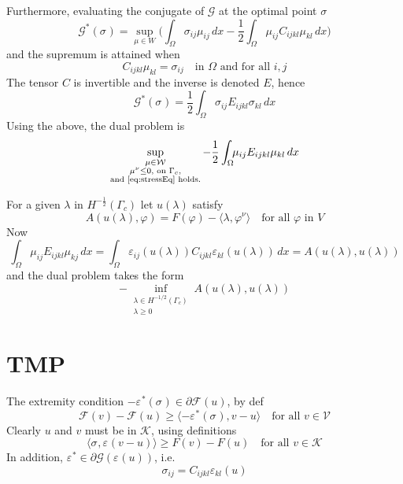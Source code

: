 \documentclass[12pt,a4paper]{article}
\numberwithin{equation}{section}
\numberwithin{table}{section}
\numberwithin{figure}{section}
\newcommand{\W}{\ensuremath{\mathcal{W}}}
\newcommand{\half}{\ensuremath{\frac{1}{2}}}
\newcommand{\V}{\ensuremath{\mathcal{V}}}
\newcommand{\K}{\ensuremath{\mathcal{K}}}
\newcommand{\F}{\ensuremath{{\mathcal F}}}
\newcommand{\G}{\ensuremath{{\mathcal G}}}
\newcommand{\intO}{\int_\Omega\!\!}
\renewcommand{\epsilon}{\varepsilon}
\renewcommand{\phi}{\varphi}
\newcommand{\strain}[1][]{\ensuremath{\epsilon_{#1}}}
\newcommand{\epsij}{\strain[ij]}
\newcommand{\epskl}{\strain[kl]}
\newcommand{\stress}[1][]{\ensuremath{\sigma_{#1}}}
\providecommand{\dualp}[2]{\langle #1, #2 \rangle}
\newcommand{\dx}{{\,dx}}
\newcommand{\ulambda}{\ensuremath{u(\lambda)}}
\begin{document}
Furthermore, evaluating the conjugate of $\G$ at the optimal point $\stress$
\begin{equation}
  \G^*(\stress) = \sup_{\mu\in W} \bigl(\intO \stress[ij] \mu_{ij} \dx
   - \half \intO \mu_{ij} C_{ijkl} \mu_{kl} \dx \bigr)
\end{equation}
and the supremum is attained when
\begin{equation}
  C_{ijkl} \mu_{kl} = \stress[ij] \quad\text{in $\Omega$ and for all $i,j$}
\end{equation}
The tensor $C$ is invertible and the inverse is denoted $E$, hence
\begin{equation}
  \G^*(\stress) = \half \intO \stress[ij] E_{ijkl} \stress[kl] \dx
\end{equation}
Using the above, the dual problem is
\begin{equation}
  \sup_{\substack{\mu\in\W \\ \mu^{\nu} \le 0, \text{ on $\Gamma_c$}, \\
   \text{and \eqref{eq:stressEq} holds.}}}
  -\half \intO \mu_{ij} E_{ijkl} \mu_{kl} \dx
\end{equation}

For a given $\lambda$ in $H^{-\half}(\Gamma_c)$ let $\ulambda$ satisfy
\begin{equation}
  A(\ulambda, \phi) = F(\phi) - \dualp{\lambda}{\phi^\nu} 
  \quad\text{for all $\phi$ in $V$}
\end{equation}
Now
\begin{equation}
  \intO \mu_{ij} E_{ijkl} \mu_{kj} \dx
  = \intO  \epsij(\ulambda) C_{ijkl} \epskl(\ulambda) \dx
  = A(\ulambda, \ulambda)
\end{equation}
and the dual problem takes the form
\begin{equation}
  - \inf_{\substack{\lambda \in H^{-1/2}(\Gamma_c) \\ \lambda \ge 0}}
  A(\ulambda, \ulambda)
\end{equation}

\section{TMP}

The extremity condition $-\strain^*(\stress) \in \partial \F(u)$, by def
\begin{equation}
	\F(v) - \F(u) \geq \dualp{-\strain^*(\stress)}{v-u} \quad\text{for all $v\in\V$}
\end{equation}
Clearly $u$ and $v$ must be in $\K$, using definitions
\begin{equation}
	\dualp{\stress}{\strain(v-u)} \geq F(v) - F(u) \quad\text{for all $v\in\K$}
\end{equation}
In addition, $\strain^* \in \partial \G(\strain(u))$, i.e.\
\begin{equation}
  \stress[ij] = C_{ijkl} \strain[kl](u)
\end{equation} 
\end{document}
